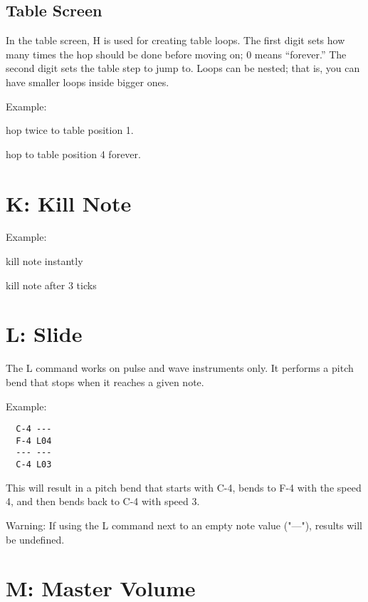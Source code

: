 \subsection{Table Screen}

In the table screen, H is used for creating table loops. The first digit sets how many times the hop should be done before moving on; 0 means ``forever.'' The second digit sets the table step to jump to. Loops can be nested; that is, you can have smaller loops inside bigger ones.

\begin{description}
\item Example:
\item[H21] hop twice to table position 1.
\item[H04] hop to table position 4 forever.
\end{description}

\section{K: Kill Note}

\begin{description}
\item Example:
\item[K00] kill note instantly
\item[K03] kill note after 3 ticks
\end{description}

\section{L: Slide}

The L command works on pulse and wave instruments only. It performs a pitch bend that stops when it reaches a given note.

Example:

\begin{verbatim}
  C-4 ---
  F-4 L04
  --- ---
  C-4 L03
\end{verbatim}

This will result in a pitch bend that starts with C-4, bends to F-4 with the speed 4, and then bends back to C-4 with speed 3.

Warning: If using the L command next to an empty note value ("---"), results will be undefined.

\section{M: Master Volume}


